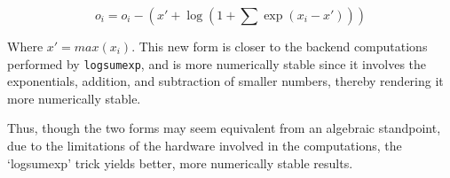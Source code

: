 \documentclass{article}
\begin{document}
\begin{equation}
o_i = o_i - (x' + \log(1 + \sum \exp(x_i - x')))
\end{equation} 

Where $x' = max(x_i)$. This new form is closer to the backend computations performed by \verb+logsumexp+, and is more numerically stable since it involves the exponentials, addition, and subtraction of smaller numbers, thereby rendering it more numerically stable.

Thus, though the two forms may seem equivalent from an algebraic standpoint, due to the limitations of the hardware involved in the computations, the `logsumexp' trick yields better, more numerically stable results.
\end{document}
